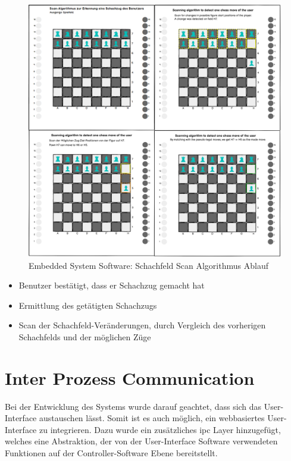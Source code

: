 \begin{figure}
\centering
\includegraphics{images/ATC_ChessMoveAlgorithm.png}
\caption{Embedded System Software: Schachfeld Scan Algorithmus Ablauf
\label{ATC_ChessMoveAlgorithm}}
\end{figure}

\begin{itemize}
\tightlist
\item
  Benutzer bestätigt, dass er Schachzug gemacht hat
\item
  Ermittlung des getätigten Schachzugs
\item
  Scan der Schachfeld-Veränderungen, durch Vergleich des vorherigen
  Schachfelds und der möglichen Züge
\end{itemize}

\hypertarget{inter-prozess-communication}{%
\section{Inter Prozess
Communication}\label{inter-prozess-communication}}

Bei der Entwicklung des Systems wurde darauf geachtet, dass sich das
User-Interface austauschen lässt. Somit ist es auch möglich, ein
webbasiertes User-Interface zu integrieren. Dazu wurde ein zusätzliches
\gls{ipc} Layer hinzugefügt, welches eine Abstraktion, der von der
User-Interface Software verwendeten Funktionen auf der
Controller-Software Ebene bereitstellt.

